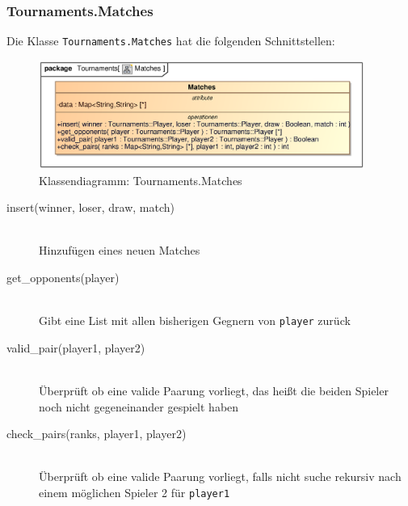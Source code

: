 \subsubsection{Tournaments.Matches}
Die Klasse \verb|Tournaments.Matches| hat die folgenden Schnittstellen:
\begin{figure}[H]
    \myfloatalign
    \includegraphics[width=0.95\textwidth]{gfx/MtGDeepAnalysis/Matches.eps}
    \caption{Klassendiagramm: Tournaments.Matches}
    \label{fig:class:Tournaments.Matches}
\end{figure}
\begin{description}
    \item[insert(winner, loser, draw, match)] \hfill \\
    Hinzufügen eines neuen Matches
    
    \item[get\_opponents(player)] \hfill \\
    Gibt eine List mit allen bisherigen Gegnern von \verb|player| zurück
    
    \item[valid\_pair(player1, player2)] \hfill \\
    Überprüft ob eine valide Paarung vorliegt, das heißt die beiden Spieler noch nicht gegeneinander gespielt haben
    
    \item[check\_pairs(ranks, player1, player2)] \hfill \\
    Überprüft ob eine valide Paarung vorliegt, falls nicht suche rekursiv nach einem möglichen Spieler 2 für \verb|player1|
\end{description}

